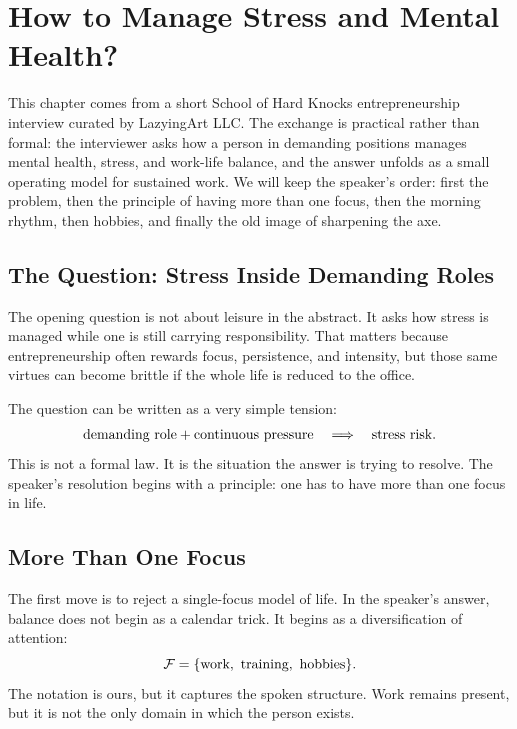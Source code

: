 \chapter{How to Manage Stress and Mental Health?}

This chapter comes from a short School of Hard Knocks entrepreneurship interview curated by LazyingArt LLC. The exchange is practical rather than formal: the interviewer asks how a person in demanding positions manages mental health, stress, and work-life balance, and the answer unfolds as a small operating model for sustained work. We will keep the speaker's order: first the problem, then the principle of having more than one focus, then the morning rhythm, then hobbies, and finally the old image of sharpening the axe.

\section{The Question: Stress Inside Demanding Roles}

The opening question is not about leisure in the abstract. It asks how stress is managed while one is still carrying responsibility. That matters because entrepreneurship often rewards focus, persistence, and intensity, but those same virtues can become brittle if the whole life is reduced to the office.

The question can be written as a very simple tension:
\begin{equation}
\hbox{demanding role}+\hbox{continuous pressure}
\quad \Longrightarrow \quad
\hbox{stress risk}.
\end{equation}
This is not a formal law. It is the situation the answer is trying to resolve. The speaker's resolution begins with a principle: one has to have more than one focus in life.

\section{More Than One Focus}

The first move is to reject a single-focus model of life. In the speaker's answer, balance does not begin as a calendar trick. It begins as a diversification of attention:
\begin{equation}
\mathcal{F}
=
\{\hbox{work},\ \hbox{training},\ \hbox{hobbies}\}.
\end{equation}
The notation is ours, but it captures the spoken structure. Work remains present, but it is not the only domain in which the person exists.

